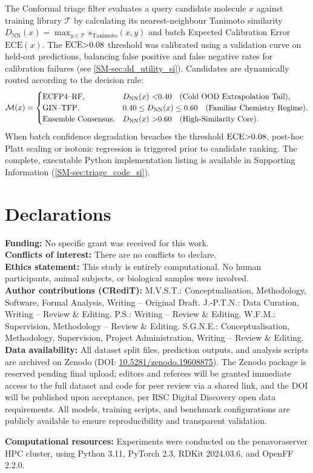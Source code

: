 \documentclass[11pt,a4paper]{article}
\begin{document}
The Conformal triage filter evaluates a query candidate molecule $x$ against training library $\mathcal{T}$ by calculating its nearest-neighbour Tanimoto similarity $D_{\text{NN}}(x) = \max_{y \in \mathcal{T}} s_{\mathrm{Tanimoto}}(x, y)$ and batch Expected Calibration Error $\mathrm{ECE}(x)$. The $\mathrm{ECE} \num{>0.08}$ threshold was calibrated using a validation curve on held-out predictions, balancing false positive and false negative rates for calibration failures (see \cref{SM-sec:dd_utility_si}). Candidates are dynamically routed according to the decision rule:
\begin{equation}\label{eq:conformal_triage}
\mathcal{M}(x) = 
\begin{cases}
\text{ECFP4--RF}, & D_{\text{NN}}(x)\ \num{<0.40} \quad \text{(Cold OOD Extrapolation Tail)}, \\
\text{GIN--TFP}, & \num{0.40} \le D_{\text{NN}}(x) \le \num{0.60} \quad \text{(Familiar Chemistry Regime)}, \\
\text{Ensemble Consensus}, & D_{\text{NN}}(x)\ \num{>0.60} \quad \text{(High-Similarity Core)}.
\end{cases}
\end{equation}
When batch confidence degradation breaches the threshold $\mathrm{ECE} \num{>0.08}$, post-hoc Platt scaling or isotonic regression is triggered prior to candidate ranking. The complete, executable Python implementation listing is available in Supporting Information (\cref{SM-sec:triage_code_si}).

\section*{Declarations}
\noindent\textbf{Funding:} No specific grant was received for this work.\\
\noindent\textbf{Conflicts of interest:} There are no conflicts to declare.\\
\noindent\textbf{Ethics statement:} This study is entirely computational. No human participants, animal subjects, or biological samples were involved.\\
\noindent\textbf{Author contributions (CRediT):} M.V.S.T.: Conceptualisation, Methodology, Software, Formal Analysis, Writing -- Original Draft. J.-P.T.N.:  Data Curation, Writing -- Review \& Editing. P.S.: Writing -- Review \& Editing. W.F.M.: Supervision, Methodology -- Review \& Editing. S.G.N.E.: Conceptualisation, Methodology, Supervision, Project Administration, Writing -- Review \& Editing.\\
\noindent\textbf{Data availability:} All dataset split files, prediction outputs, and analysis scripts are archived on Zenodo (DOI: \href{https://doi.org/10.5281/zenodo.19608875}{10.5281/zenodo.19608875}). The Zenodo package is reserved pending final upload; editors and referees will be granted immediate access to the full dataset and code for peer review via a shared link, and the DOI will be published upon acceptance, per RSC Digital Discovery open data requirements. All models, training scripts, and benchmark configurations are publicly available to ensure reproducibility and transparent validation.

\textbf{Computational resources:} Experiments were conducted on the penavoraserver HPC cluster, using Python 3.11, PyTorch 2.3, RDKit 2024.03.6, and OpenFF 2.2.0.



\end{document}
